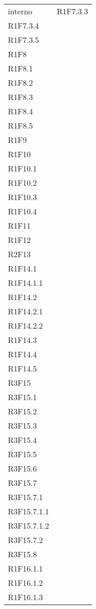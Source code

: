 \begin{longtable}{ >{\centering}p{}
		>{\centering}p{}}
	interno & R1F7.3.3 \\R1F7.3.4 \\R1F7.3.5 \\R1F8	\\R1F8.1 \\ R1F8.2 \\ R1F8.3 \\R1F8.4 \\R1F8.5 \\R1F9 \\R1F10 \\R1F10.1 \\R1F10.2 \\R1F10.3 \\R1F10.4 \\R1F11 \\R1F12 \\R2F13 \\R1F14.1 \\R1F14.1.1 \\R1F14.2 \\R1F14.2.1 \\R1F14.2.2 \\R1F14.3 \\R1F14.4 \\R1F14.5 \\R3F15 \\R3F15.1 \\R3F15.2 \\R3F15.3 \\R3F15.4 \\R3F15.5 \\R3F15.6 \\R3F15.7 \\R3F15.7.1 \\R3F15.7.1.1 \\R3F15.7.1.2 \\R3F15.7.2 \\R3F15.8 \\R1F16.1.1 \\R1F16.1.2 \\R1F16.1.3
	

\end{longtable}
